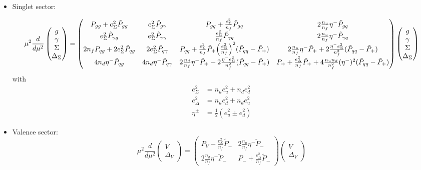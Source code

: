 \documentclass[a4paper,twoside]{article}
\title{}
\author{}
\date{}
\begin{document}
\maketitle
\begin{itemize}
\item Singlet sector:

\begin{equation*}
\mu^2\frac{d}{d\mu^2}
\begin{pmatrix}
g \\
\gamma \\
\Sigma \\
\Delta_\Sigma
\end{pmatrix}
=
\begin{pmatrix}
 P_{gg}+e_\Sigma^2 \tilde{P}_{gg} & e_\Sigma^2 \tilde{P}_{g\gamma} & P_{gq} + \frac{e_\Sigma^2}{n_f}\tilde{P}_{gq} & 2\frac{n_u}{n_f}\eta^- \tilde{P}_{gq} \\
 e_\Sigma^2 \tilde{P}_{\gamma g} & e_\Sigma^2 \tilde{P}_{\gamma \gamma} & \frac{e_\Sigma^2}{n_f}\tilde{P}_{\gamma q} & 2\frac{n_u}{n_f}\eta^- \tilde{P}_{\gamma q} \\
 2n_f P_{qg} +2e_\Sigma^2  \tilde{P}_{qg} & 2 e_\Sigma^2  \tilde{P}_{q\gamma} & P_{qq}+ \frac{e_\Sigma^2}{n_f}\tilde{P}_{+}  \Bigl(\frac{e_\Sigma^2}{n_f}\Bigr)^2(\tilde{P}_{qq}-\tilde{P}_{+}) & 2\frac{n_u}{n_f}\eta^-\tilde{P}_{+}+2\frac{\eta^-e_\Sigma^2}{n_f^2}(\tilde{P}_{qq}-\tilde{P}_{+}) \\
 4n_d\eta^-\tilde{P}_{qg} & 4n_d\eta^-\tilde{P}_{q\gamma} & 2\frac{n_d}{n_f}\eta^- \tilde{P}_{+} +2\frac{\eta^-e_\Sigma^2}{n_f^2}(\tilde{P}_{qq}-\tilde{P}_{+}) & P_+ +\frac{e_\Delta^2}{n_f}\tilde{P}_{+} +4\frac{n_u n_d}{n_f^2}(\eta^-)^2(\tilde{P}_{qq}-\tilde{P}_{+})
\end{pmatrix}
\begin{pmatrix}
g \\
\gamma \\
\Sigma \\
\Delta_\Sigma
\end{pmatrix}
\end{equation*}
with
\begin{align*}
e_\Sigma^2&=n_u e_u^2+n_d e_d^2 \\
e_\Delta^2&=n_u e_d^2+n_d e_u^2 \\
\eta^\pm &= \frac{1}{2}(e_u^2 \pm e_d^2)
\end{align*}

\item Valence sector:
\begin{equation*}
\mu^2\frac{d}{d\mu^2}
\begin{pmatrix}
V \\
\Delta_V
\end{pmatrix}
=
\begin{pmatrix}
P_V+\frac{e_\Sigma^2}{n_f} \tilde{P}_{-} & 2\frac{n_u}{n_f}\eta^- \tilde{P}_{-}\\
 2\frac{n_d}{n_f}\eta^- \tilde{P}_{-}& P_-+\frac{e_\Delta^2}{n_f} \tilde{P}_{-}
\end{pmatrix}
\begin{pmatrix}
V \\
\Delta_V
\end{pmatrix}
\end{equation*}


\end{itemize}
\end{document}
